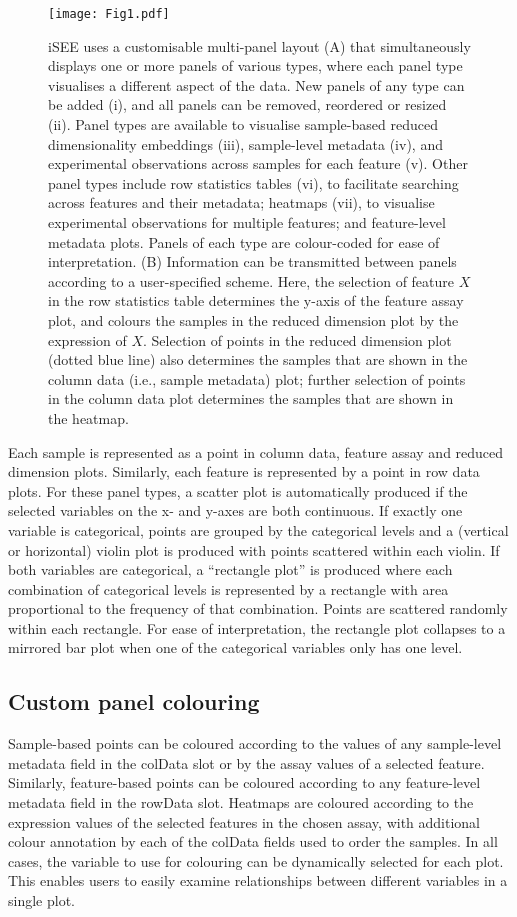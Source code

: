 \documentclass[10pt,a4paper,twocolumn]{article}
\begin{document}
\begin{figure*}[t]
\texttt{[image: Fig1.pdf]}
\caption{iSEE uses a customisable multi-panel layout (A) that simultaneously displays one or more panels of various types, where each panel type visualises a different aspect of the data.
New panels of any type can be added (i), and all panels can be removed, reordered or resized (ii).
Panel types are available to visualise sample-based reduced dimensionality embeddings (iii), sample-level metadata (iv), and experimental observations across samples for each feature (v).
Other panel types include row statistics tables (vi), to facilitate searching across features and their metadata; heatmaps (vii), to visualise experimental observations for multiple features; and feature-level metadata plots.
Panels of each type are colour-coded for ease of interpretation.
(B) Information can be transmitted between panels according to a user-specified scheme.
Here, the selection of feature $X$ in the row statistics table determines the y-axis of the feature assay plot, and colours the samples in the reduced dimension plot by the expression of $X$.
Selection of points in the reduced dimension plot (dotted blue line) also determines the samples that are shown in the column data (i.e., sample metadata) plot;
further selection of points in the column data plot determines the samples that are shown in the heatmap.
}
\label{fig:iSEE}
\end{figure*}

Each sample is represented as a point in column data, feature assay and reduced dimension plots.
Similarly, each feature is represented by a point in row data plots.
For these panel types, a scatter plot is automatically produced if the selected variables on the x- and y-axes are both continuous.
If exactly one variable is categorical, points are grouped by the categorical levels and a (vertical or horizontal) violin plot is produced with points scattered within each violin.
If both variables are categorical, a ``rectangle plot'' is produced where each combination of categorical levels is represented by a rectangle with area proportional to the frequency of that combination.
Points are scattered randomly within each rectangle.
For ease of interpretation, the rectangle plot collapses to a mirrored bar plot when one of the categorical variables only has one level.

\subsection*{Custom panel colouring}
Sample-based points can be coloured according to the values of any sample-level metadata field in the colData slot or by the assay values of a selected feature.
Similarly, feature-based points can be coloured according to any feature-level metadata field in the rowData slot.
Heatmaps are coloured according to the expression values of the selected features in the chosen assay,
with additional colour annotation by each of the colData fields used to order the samples.
In all cases, the variable to use for colouring can be dynamically selected for each plot.
This enables users to easily examine relationships between different variables in a single plot. \\
\end{document}
